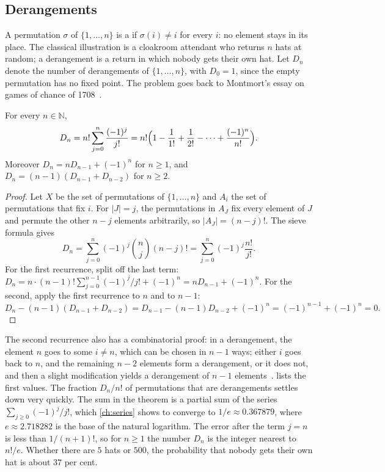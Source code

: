 \subsection{Derangements}

A permutation $\sigma$ of $\{1,\ldots,n\}$ is a  if $\sigma(i)\ne i$ for every $i$: no element stays in its place. The classical illustration is a cloakroom attendant who returns $n$ hats at random; a derangement is a return in which nobody gets their own hat. Let $D_n$ denote the number of derangements of $\{1,\ldots,n\}$, with $D_0=1$, since the empty permutation has no fixed point. The problem goes back to Montmort's essay on games of chance of 1708~\cite{montmort1708}.

\begin{theorem}
\label{thm:derangements}
For every $n\in\mathbb N$,
\[
D_n=n!\sum_{j=0}^{n}\frac{(-1)^j}{j!}=n!\Bigl(1-\frac1{1!}+\frac1{2!}-\cdots+\frac{(-1)^n}{n!}\Bigr).
\]
Moreover $D_n=nD_{n-1}+(-1)^n$ for $n\ge1$, and $D_n=(n-1)(D_{n-1}+D_{n-2})$ for $n\ge2$.
\end{theorem}

\begin{proof}
Let $X$ be the set of permutations of $\{1,\ldots,n\}$ and $A_i$ the set of permutations that fix $i$. For $|J|=j$, the permutations in $A_J$ fix every element of $J$ and permute the other $n-j$ elements arbitrarily, so $|A_J|=(n-j)!$. The sieve formula gives
\[
D_n=\sum_{j=0}^{n}(-1)^j\binom nj(n-j)!=\sum_{j=0}^{n}(-1)^j\frac{n!}{j!}.
\]
For the first recurrence, split off the last term: $D_n=n\cdot(n-1)!\sum_{j=0}^{n-1}(-1)^j/j!+(-1)^n=nD_{n-1}+(-1)^n$. For the second, apply the first recurrence to $n$ and to $n-1$:
\[
D_n-(n-1)(D_{n-1}+D_{n-2})=D_{n-1}-(n-1)D_{n-2}+(-1)^n=(-1)^{n-1}+(-1)^n=0.
\]
\end{proof}

The second recurrence also has a combinatorial proof: in a derangement, the element $n$ goes to some $i\ne n$, which can be chosen in $n-1$ ways; either $i$ goes back to $n$, and the remaining $n-2$ elements form a derangement, or it does not, and then a slight modification yields a derangement of $n-1$ elements~\cite[Sect.~2.2]{stanley2012ec1}.  lists the first values. The fraction $D_n/n!$ of permutations that are derangements settles down very quickly. The sum in the theorem is a partial sum of the series $\sum_{j\ge0}(-1)^j/j!$, which \cref{ch:series} shows to converge to $1/e\approx0.367879$, where $e\approx2.718282$ is the base of the natural logarithm. The error after the term $j=n$ is less than $1/(n+1)!$, so for $n\ge1$ the number $D_n$ is the integer nearest to $n!/e$. Whether there are $5$ hats or $500$, the probability that nobody gets their own hat is about $37$ per cent.

